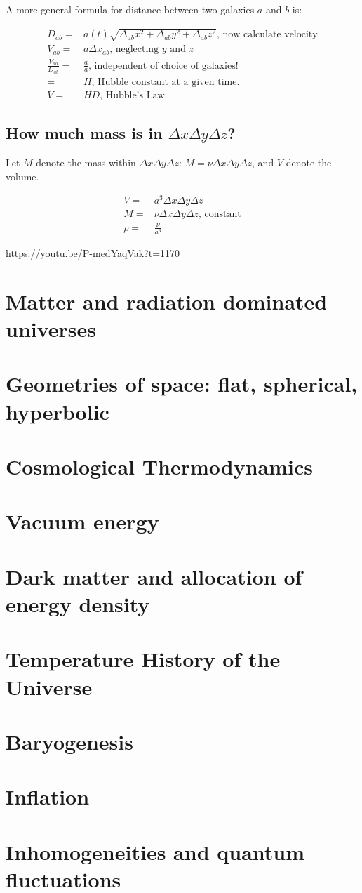 \documentclass[]{article}
\begin{document}
 A more general formula for distance between two galaxies $a$ and $b$ is:
 
 \begin{align*}
 	D_{ab}=&a(t) \sqrt{\Delta_{ab} x^2 + \Delta_{ab} y^2 + \Delta_{ab} z^2} \text{, now calculate velocity}\\
 	V_{ab}=&\dot{a} \Delta x_{ab} \text{, neglecting $y$ and $z$}\\
 	\frac{V_{ab}}{D_{ab}} =& \frac{\dot{a}}{a} \text{, independent of choice of galaxies!}\\
 	=& H \text{, Hubble constant at a given time.}\\
 	V =& H D \text{, Hubble's Law.}
\end{align*}
 
\subsection{How much mass is in $\Delta x \Delta y \Delta z$?}

Let $M$ denote the mass within $\Delta x \Delta y \Delta z$: $M = \nu \Delta x \Delta y \Delta z$, and $V$ denote the volume.

\begin{align*}
	V =& a^3 \Delta x \Delta y \Delta z\\
	M =& \nu \Delta x \Delta y \Delta z \text{, constant}\\
	\rho =& \frac{\nu}{a^3}
\end{align*}




\url{https://youtu.be/P-medYaqVak?t=1170}

\section{Matter and radiation dominated universes}
\section{Geometries of space: flat, spherical, hyperbolic}
\section{Cosmological Thermodynamics}
\section{Vacuum energy}
\section{Dark matter and allocation of energy density}
\section{Temperature History of the Universe}
\section{Baryogenesis}
\section{Inflation}
\section{Inhomogeneities and quantum fluctuations}



\raggedright

\end{document}
